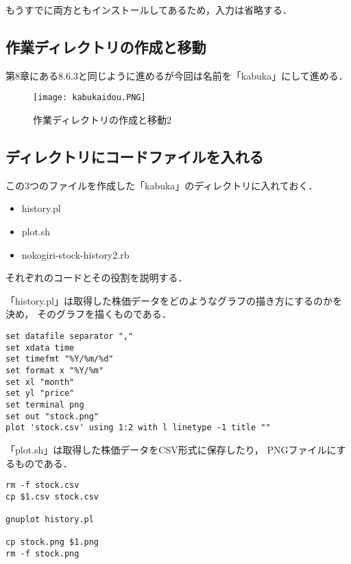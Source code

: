 もうすでに両方ともインストールしてあるため，入力は省略する．

\subsection{作業ディレクトリの作成と移動}

第8章にある8.6.3と同じように進めるが今回は名前を「kabuka」にして進める．

\begin{figure}[H]
\centering
\texttt{[image: kabukaidou.PNG]}
\caption{作業ディレクトリの作成と移動2}\label{サンプル図}
\end{figure}

\subsection{ディレクトリにコードファイルを入れる}



この3つのファイルを作成した「kabuka」のディレクトリに入れておく．
\begin{itemize}
  \item history.pl
  \item plot.sh
  \item nokogiri-stock-history2.rb
\end{itemize}



それぞれのコードとその役割を説明する．



「history.pl」は取得した株価データをどのようなグラフの描き方にするのかを決め，
そのグラフを描くものである．
\begin{lstlisting}
set datafile separator ","
set xdata time
set timefmt "%Y/%m/%d"
set format x "%Y/%m"
set xl "month"
set yl "price"
set terminal png
set out "stock.png"
plot 'stock.csv' using 1:2 with l linetype -1 title ""

\end{lstlisting}

「plot.sh」は取得した株価データをCSV形式に保存したり，
PNGファイルにするものである．
\begin{lstlisting}
rm -f stock.csv
cp $1.csv stock.csv

gnuplot history.pl

cp stock.png $1.png
rm -f stock.png

\end{lstlisting}

